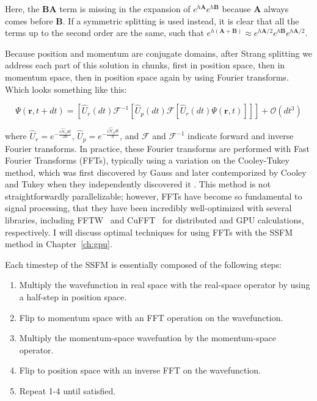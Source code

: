 \noindent Here, the $\mathbf{BA}$ term is missing in the expansion of $e^{h\mathbf{A}}e^{h\mathbf{B}}$ because $\mathbf{A}$ always comes before $\mathbf{B}$.
If a symmetric splitting is used instead, it is clear that all the terms up to the second order are the same, such that $e^{h(\mathbf{A}+\mathbf{B})} \approx e^{h\mathbf{A}/2}e^{h\mathbf{B}}e^{h\mathbf{A}/2}$.

Because position and momentum are conjugate domains, after Strang splitting we address each part of this solution in chunks, first in position space, then in momentum space, then in position space again by using Fourier transforms.
Which looks something like this:

\begin{equation}
\Psi(\mathbf{r}, t+dt) = \left[\hat{U}_r(dt)\mathcal{F}^{-1}\left[\hat{U}_p(dt) \mathcal{F} \left[\hat{U}_r(dt) \Psi(\mathbf{r},t) \right] \right] \right] + \mathcal{O}(dt^3)
\end{equation}

\noindent where $\hat{U}_r = e^{-\frac{i\mathcal{\hat{H}}_vdt}{2\hbar}}$, $\hat{U}_p = e^{-\frac{i\mathcal{\hat{H}}_pdt}{\hbar}}$, and $\mathcal{F}$ and $\mathcal{F}^{-1}$ indicate forward and inverse Fourier transforms.
In practice, these Fourier transforms are performed with Fast Fourier Transforms (FFTs), typically using a variation on the Cooley-Tukey method, which was first discovered by Gauss and later contemporized by Cooley and Tukey when they independently discovered it \cite{cooley1965}.
This method is not straightforwardly parallelizable; however, FFTs have become so fundamental to signal processing, that they have been incredibly well-optimized with several libraries, including FFTW~\cite{frigo1998} and CuFFT~\cite{fatica2008} for distributed and GPU calculations, respectively.
I will discuss optimal techniques for using FFTs with the SSFM method in Chapter~\ref{ch:gpu}.

Each timestep of the SSFM is essentially composed of the following steps:

\begin{enumerate}
\item Multiply the wavefunction in real space with the real-space operator by using a half-step in position space.
\item Flip to momentum space with an FFT operation on the wavefunction.
\item Multiply the momentum-space wavefuntion by the momentum-space operator.
\item Flip to position space with an inverse FFT on the wavefunction.
\item Repeat 1-4 until satisfied.
\end{enumerate}


